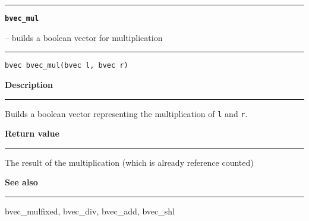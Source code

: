 \begin{minipage}{\textwidth}

\noindent\begin{minipage}{\textwidth}
\rule{\textwidth}{0.5mm}
{\tt\bf bvec\_mul }
\--- builds a boolean vector for multiplication  \hspace{\fill}
\\\rule[1.5ex]{\textwidth}{0.5mm}
\end{minipage}

\noindent\begin{verbatim}
bvec bvec_mul(bvec l, bvec r) 
\end{verbatim}

\vspace{\parsep}\noindent
{\bf Description}\\\rule[1.5ex]{\textwidth}{0.2mm}\vspace{-1.5ex}\setlength{\parindent}{1em}
Builds a boolean vector representing the multiplication
           of {\tt l} and {\tt r}. 

\setlength{\parindent}{0em}\vspace{\parsep}\vspace{\baselineskip}\noindent
{\bf Return value}\\\rule[1.5ex]{\textwidth}{0.2mm}\vspace{-1.5ex}
The result of the multiplication (which is already reference counted) 

\vspace{\parsep}\vspace{\baselineskip}\noindent
{\bf See also}\\\rule[1.5ex]{\textwidth}{0.2mm}\vspace{-1.5ex}
bvec\_mulfixed, bvec\_div, bvec\_add, bvec\_shl 
\end{minipage}
\vspace{8ex}
